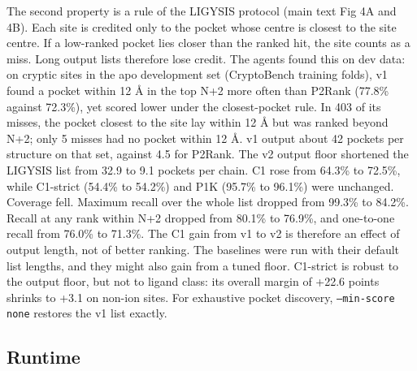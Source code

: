 \documentclass[10pt,letterpaper]{article}
\begin{document}
The second property is a rule of the LIGYSIS protocol (main text Fig 4A and 4B). Each site is credited only to the pocket whose centre is closest to the site centre. If a low-ranked pocket lies closer than the ranked hit, the site counts as a miss. Long output lists therefore lose credit. The agents found this on dev data: on cryptic sites in the apo development set (CryptoBench training folds), v1 found a pocket within 12 \AA{} in the top N+2 more often than P2Rank (77.8\% against 72.3\%), yet scored lower under the closest-pocket rule. In 403 of its misses, the pocket closest to the site lay within 12 \AA{} but was ranked beyond N+2; only 5 misses had no pocket within 12 \AA{}. v1 output about 42 pockets per structure on that set, against 4.5 for P2Rank. The v2 output floor shortened the LIGYSIS list from 32.9 to 9.1 pockets per chain. C1 rose from 64.3\% to 72.5\%, while C1-strict (54.4\% to 54.2\%) and P1K (95.7\% to 96.1\%) were unchanged. Coverage fell. Maximum recall over the whole list dropped from 99.3\% to 84.2\%. Recall at any rank within N+2 dropped from 80.1\% to 76.9\%, and one-to-one recall from 76.0\% to 71.3\%. The C1 gain from v1 to v2 is therefore an effect of output length, not of better ranking. The baselines were run with their default list lengths, and they might also gain from a tuned floor. C1-strict is robust to the output floor, but not to ligand class: its overall margin of +22.6 points shrinks to +3.1 on non-ion sites. For exhaustive pocket discovery, \texttt{--min-score none} restores the v1 list exactly.

\subsection*{Runtime}
\end{document}
